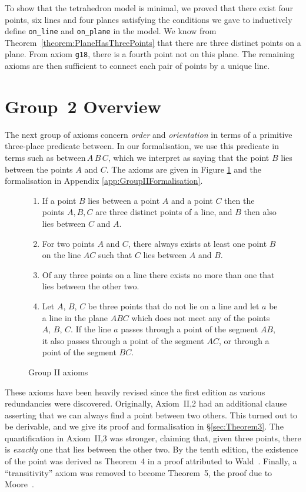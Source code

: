 To show that the tetrahedron model is minimal, we proved that there exist four points, six lines and four planes satisfying the conditions we gave to inductively define \texttt{on\_line} and \texttt{on\_plane} in the model. We know from Theorem~\ref{theorem:PlaneHasThreePoints} that there are three distinct points on a plane. From axiom \texttt{g18}, there is a fourth point not on this plane. The remaining axioms are then sufficient to connect each pair of points by a unique line.

\section{Group~2 Overview}
The next group of axioms concern \emph{order} and \emph{orientation} in terms of a primitive three-place predicate $\text{between}$. In our formalisation, we use this predicate in terms such as $\text{between}\,A\,B\,C$, which we interpret as saying that the point $B$ lies between the points $A$ and $C$. The axioms are given in Figure \ref{fig:GroupII} and the formalisation in Appendix \ref{app:GroupIIFormalisation}.

\begin{figure}
  \begin{enumerate}
  \item[II,1] If a point $B$ lies between a point $A$ and a point $C$ then the points $A,B,C$ are three distinct points of a line, and $B$ then also lies between $C$ and $A$.
  \item[II,2] For two points $A$ and $C$, there always exists at least one point $B$ on the line $AC$ such that $C$ lies between $A$ and $B$.
  \item[II,3] Of any three points on a line there exists no more than one that lies between the other two.
  \item[II,4] Let $A$, $B$, $C$ be three points that do not lie on a line and let $a$ be a line in the plane $ABC$ which does not meet any of the points $A$, $B$, $C$. If the line $a$ passes through a point of the segment $AB$, it also passes through a point of the segment $AC$, or through a point of the segment $BC$.
  \end{enumerate}
  \caption{Group II axioms}
  \label{fig:GroupII}
\end{figure}

These axioms have been heavily revised since the first edition as various redundancies were discovered. Originally, Axiom~II,2 had an additional clause asserting that we can always find a point between two others. This turned out to be derivable, and we give its proof and formalisation in \S\ref{sec:Theorem3}. The quantification in Axiom~II,3 was stronger, claiming that, given three points, there is \emph{exactly} one that lies between the other two. By the tenth edition, the existence of the point was derived as Theorem~4 in a proof attributed to Wald~\cite{FoundationsOfGeometry}. Finally, a ``transitivity'' axiom was removed to become Theorem~5, the proof due to Moore~\cite{MooreProof}.

